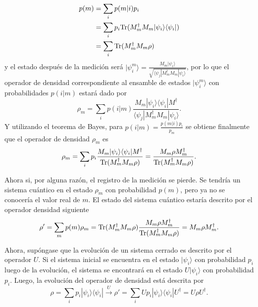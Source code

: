 \begin{equation}
	\label{probabilidad_m}
	\begin{split}
	p(m) &= \sum_{i}p(m|i)p_i\\
	&=\sum_i p_i{\rm Tr}(M_m^{\dagger} M_m |\psi_i\rangle \langle\psi_i|)\\
	&=\sum_{i}{\rm Tr}(M_m^{\dagger} M_m \rho)
	\end{split}
\end{equation} y el estado después de la medición será $|\psi_i^m\rangle=\frac{M_m|\psi_i\rangle}{\sqrt{\langle\psi_j|M_m^{\dagger}M_m|\psi_i\rangle}}$, por lo que el operador de densidad correspondiente al ensamble de estados $|\psi_i^m\rangle$ con probabilidades $p(i|m)$ estará dado por \[\rho_m=\sum_i p(i|m)\frac{M_m|\psi_i\rangle \langle \psi_i|M^{\dagger}}{\langle\psi_j|M_m^{\dagger}M_m|\psi_i\rangle}.\] Y  utilizando el teorema de Bayes, para $p(i|m)=\frac{p(m|i)p_i}{p_m}$ se obtiene finalmente que el operador de densidad $\rho_m$ es{\cite{nielsen_chuang_2010}} \begin{equation}
	\rho_m=\sum_i p_i \dfrac{M_m|\psi_i\rangle \langle \psi_i|M^{\dagger}}{{\rm Tr}(M^{\dagger}_m M_m \rho )}=\dfrac{M_m \rho M_m^{\dagger}}{{\rm Tr} (M^{\dagger}_m M_m\rho )}.
\end{equation}


Ahora si, por alguna razón, el registro de la medición se pierde. Se tendría un sistema cuántico en el estado $\rho_m$ con probabilidad $p(m)$, pero ya no se conocería el valor real de $m$. El estado del sistema cuántico estaría descrito por el operador densidad siguiente \begin{equation}
	\rho'=\sum_m p(m)\rho_m={\rm Tr}(M^{\dagger}_m M_m\rho )\dfrac{M_m\rho M_m^{\dagger}}{{\rm Tr} (M^{\dagger}_m M_m \rho )}=M_m\rho M_m^{\dagger}.
\end{equation}


 
 Ahora, supóngase que la evolución de un sistema cerrado es descrito por el operador $U$. Si el sistema inicial se encuentra en el estado $|\psi_i\rangle$ con probabilidad $p_i$ luego de la evolución, el sistema se encontrará en el estado $U|\psi_i\rangle$ con probabilidad $p_i$. Luego, la evolución del operador de densidad está descrita por {\cite{nielsen_chuang_2010}}\[\rho=\sum_{i}p_i|\psi_i\rangle \langle \psi_i|\xrightarrow{U}\rho'=\sum_{i}Up_i|\psi_i\rangle \langle \psi_i|U^{\dagger}=U\rho U^{\dagger}.\]


